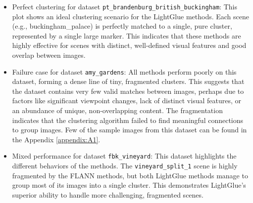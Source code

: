 \documentclass[report.tex]{subfiles}
\begin{document}
\begin{itemize}
    \item Perfect clustering for dataset \texttt{pt\_brandenburg\_british\_buckingham}: This plot shows an ideal clustering scenario for the LightGlue methods. Each scene (e.g., buckingham\_palace) is perfectly matched to a single, pure cluster, represented by a single large marker. This indicates that these methods are highly effective for scenes with distinct, well-defined visual features and good overlap between images.
    \item Failure case for dataset \texttt{amy\_gardens}: All methods perform poorly on this dataset, forming a dense line of tiny, fragmented clusters. This suggests that the dataset contains very few valid matches between images, perhaps due to factors like significant viewpoint changes, lack of distinct visual features, or an abundance of unique, non-overlapping content. The fragmentation indicates that the clustering algorithm failed to find meaningful connections to group images. Few of the sample images from this dataset can be found in the Appendix \ref{appendix:A1}.

    \item Mixed performance for dataset \texttt{fbk\_vineyard}: This dataset highlights the different behaviors of the methods. The \texttt{vineyard\_split\_1} scene is highly fragmented by the FLANN methods, but both LightGlue methods manage to group most of its images into a single cluster. This demonstrates LightGlue's superior ability to handle more challenging, fragmented scenes.

\end{itemize}
\end{document}

